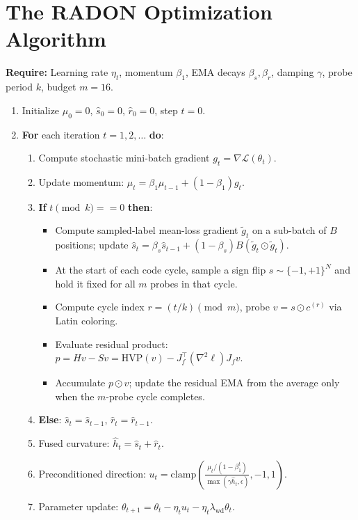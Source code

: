 \documentclass[11pt,a4paper]{article}
\theoremstyle{definition}
\theoremstyle{remark}
\begin{document}
\section{The RADON Optimization Algorithm}

\begin{tcolorbox}[colback=gray!5,colframe=gray!50,arc=2mm,title={\textbf{Algorithm 1: RADON Optimizer}}]
\small
\textbf{Require:} Learning rate $\eta_t$, momentum $\beta_1$, EMA decays $\beta_s, \beta_r$, damping $\gamma$, probe period $k$, budget $m=16$.
\begin{enumerate}
    \item Initialize $\mu_0 = 0$, $\hat{s}_0 = 0$, $\hat{r}_0 = 0$, step $t = 0$.
    \item \textbf{For} each iteration $t = 1, 2, \dots$ \textbf{do}:
    \begin{enumerate}
        \item Compute stochastic mini-batch gradient $g_t = \nabla \mathcal{L}(\theta_t)$.
        \item Update momentum: $\mu_t = \beta_1 \mu_{t-1} + (1 - \beta_1) g_t$.
        \item \textbf{If} $t \pmod k == 0$ \textbf{then}:
        \begin{itemize}
            \item Compute sampled-label mean-loss gradient $\tilde{g}_t$ on a sub-batch of $B$ positions; update $\hat{s}_t = \beta_s \hat{s}_{t-1} + (1 - \beta_s) B(\tilde{g}_t \odot \tilde{g}_t)$.
            \item At the start of each code cycle, sample a sign flip $s \sim \{-1, +1\}^N$ and hold it fixed for all $m$ probes in that cycle.
            \item Compute cycle index $r = (t / k) \pmod m$, probe $v = s \odot c^{(r)}$ via Latin coloring.
            \item Evaluate residual product: $p = H v - S v = \mathrm{HVP}(v) - J_f^\top (\nabla^2 \ell) J_f v$.
            \item Accumulate $p \odot v$; update the residual EMA from the average only when the $m$-probe cycle completes.
        \end{itemize}
        \item \textbf{Else}: $\hat{s}_t = \hat{s}_{t-1}$, $\hat{r}_t = \hat{r}_{t-1}$.
        \item Fused curvature: $\hat{h}_t = \hat{s}_t + \hat{r}_t$.
        \item Preconditioned direction: $u_t = \mathrm{clamp}\left( \frac{\mu_t / (1 - \beta_1^t)}{\max(\gamma \hat{h}_t, \epsilon)}, -1, 1 \right)$.
        \item Parameter update: $\theta_{t+1} = \theta_t - \eta_t u_t - \eta_t \lambda_{\mathrm{wd}} \theta_t$.
    \end{enumerate}
\end{enumerate}
\end{tcolorbox}
\end{document}
